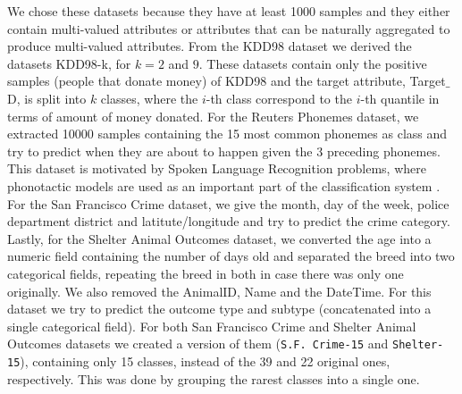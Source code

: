 We chose  these datasets  because they
have at least 1000 samples and they  either contain  multi-valued attributes 
or attributes that can be naturally aggregated to produce multi-valued attributes. 
From the KDD98 dataset we derived the datasets
KDD98-k, for $k = 2$ and $9$. These datasets contain
only the positive samples (people that donate money) 
of KDD98 and the target attribute, Target$\_$D, is split into $k$ classes, where the $i$-th
class correspond to the $i$-th quantile in terms of amount of money donated. For the Reuters Phonemes dataset,
we extracted 10000 samples containing the 15 most common phonemes as class and try to predict when they are about to happen given the 3 preceding phonemes.
This dataset is motivated by Spoken Language Recognition problems, where phonotactic models are used as an important part of the classification system
\cite{conf/interspeech/Navratil06}. 
For the San Francisco Crime dataset, we give the month, day of the week, police department district and latitute/longitude and try to predict the crime category. Lastly, for the Shelter Animal Outcomes dataset, we converted the age into a numeric field containing the
number of days old and separated the breed into two categorical fields, repeating the breed in both in case there was only one originally. We also removed the AnimalID, Name and the DateTime. For this dataset we try to predict the outcome type and subtype (concatenated into a single categorical field). For both 
San Francisco Crime and  Shelter Animal Outcomes
 datasets we created a version of them ({\tt S.F. Crime-15} and {\tt Shelter-15}), containing only 15 classes, instead of the 39 and 22 original ones, respectively. This was done by grouping the rarest classes into a single one. 

